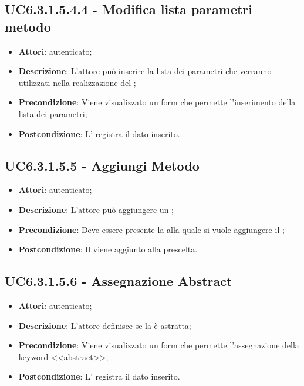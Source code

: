 \subsection{UC6.3.1.5.4.4 - Modifica lista parametri metodo}
\label{ssec:UC6.3.1.5.4.4}
\begin{itemize}
\item \textbf{Attori}:  autenticato;
\item \textbf{Descrizione}: L'attore può inserire la lista dei parametri che verranno utilizzati nella realizzazione del ;
\item \textbf{Precondizione}: Viene visualizzato un form che permette l'inserimento della lista dei parametri;
\item \textbf{Postcondizione}: L' registra il dato inserito.
\end{itemize}
\subsection{UC6.3.1.5.5 - Aggiungi Metodo}
\label{ssec:UC6.3.1.5.5}
\begin{itemize}
\item \textbf{Attori}:  autenticato;
\item \textbf{Descrizione}: L'attore può aggiungere un ;
\item \textbf{Precondizione}: Deve essere presente la  alla quale si vuole aggiungere il ;
\item \textbf{Postcondizione}: Il  viene aggiunto alla  prescelta.
\end{itemize}
\subsection{UC6.3.1.5.6 - Assegnazione Abstract}
\label{ssec:UC6.3.1.5.6}
\begin{itemize}
\item \textbf{Attori}:  autenticato;
\item \textbf{Descrizione}: L'attore definisce se la  è astratta;
\item \textbf{Precondizione}: Viene visualizzato un form che permette l'assegnazione della keyword <<abstract>>;
\item \textbf{Postcondizione}: L' registra il dato inserito.
\end{itemize}
